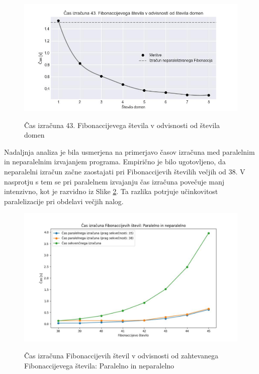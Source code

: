 \documentclass[mat1, tisk]{fmfdelo}
\begin{document}
\begin{figure}[h!]
  \centering
  \caption{Čas izračuna 43. Fibonaccijevega števila v odvisnosti od števila domen}
  \includegraphics[width=13cm]{slike/fib_par_v_odvisnosti_od_domen.jpg}
  \label{fig:fib_par_v_odvisnosti_od_domen}
\end{figure}

Nadaljnja analiza je bila usmerjena na primerjavo časov izračuna med paralelnim in neparalelnim izvajanjem programa. 
Empirično je bilo ugotovljeno, da neparalelni izračun začne zaostajati pri Fibonaccijevih številih večjih od 38. 
V nasprotju s tem se pri paralelnem izvajanju čas izračuna povečuje manj intenzivno, kot je razvidno iz Slike 
\ref{fig:fib_par_v_odvisnosti_od_n}. Ta razlika potrjuje učinkovitost paralelizacije pri obdelavi večjih nalog.

\begin{figure}[h!]
  \centering
  \caption{Čas izračuna Fibonaccijevih števil v odvisnosti od zahtevanega Fibonaccijevega števila: Paralelno in neparalelno}
  \includegraphics[width=15cm]{slike/fib_par_v_odvisnosti_od_n.jpg}
  \label{fig:fib_par_v_odvisnosti_od_n}
\end{figure}
\end{document}
